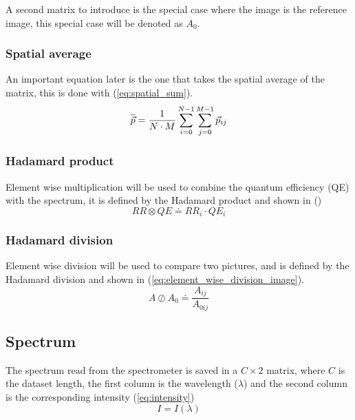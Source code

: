 A second matrix to introduce is the special case where the image is the reference image, this special case will be denoted as $A_0$.

\subsubsection{Spatial average}
\label{sec:spatial_average}

An important equation later is the one that takes the spatial average of the matrix, this is done with (\ref{eq:spatial_sum}).
\begin{equation}
    \label{eq:spatial_sum}
    \overline{\vec{p}} = \frac{1}{N \cdot M} \sum_{i=0}^{N-1} \sum_{j=0}^{M-1} \vec{p}_{ij}
\end{equation}

\subsubsection{Hadamard product}
\label{sec:hadamard_product}
Element wise multiplication will be used to combine the quantum efficiency (QE) with the spectrum, it is defined by the Hadamard product \cite{millionIntroductionBasicResults} and shown in ()
\begin{equation}
    \label{eq:element_wise_product_spectrum}
    RR \otimes QE \doteq RR_i \cdot QE_i
\end{equation}

\subsubsection{Hadamard division}
\label{sec:hadamard_division}
Element wise division will be used to compare two pictures, and is defined by the Hadamard division \cite{HadamardDivisionInfixed} and shown in (\ref{eq:element_wise_division_image}).
\begin{equation}
    \label{eq:element_wise_division_image}
    A \oslash  A_0 \doteq  \frac{A_{ij}}{A_{0ij} } %
\end{equation}


\subsection{Spectrum}
\label{sec:spectrum}

The spectrum read from the spectrometer is saved in a $C \times 2$ matrix, where $C$ is the dataset length, the first column is the wavelength ($\lambda$) and the second column is the corresponding intensity (\ref{eq:intensity})
\begin{equation}
    \label{eq:intensity}
    I = I(\lambda)    
\end{equation}

